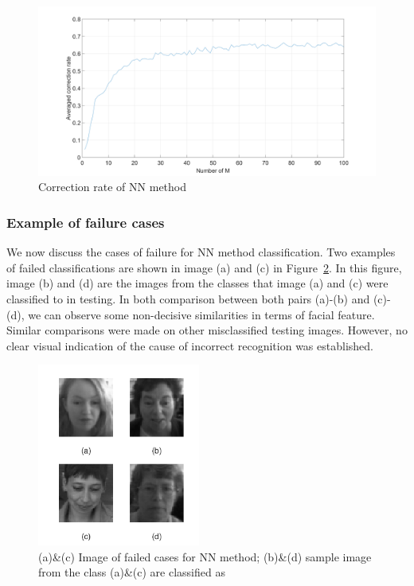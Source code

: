 \documentclass[10pt,twocolumn,letterpaper]{article}
\begin{document}
	\begin{figure}
		\begin{center}
			\includegraphics[width=1\linewidth]{correctRate_NN}
			\caption{Correction rate of NN method}
			\label{fig:q4_nn_rate}
		\end{center}
	\end{figure}
	
	
\subsubsection{Example of failure cases}
We now discuss the cases of failure for NN method classification. Two examples of failed classifications are shown in image (a) and (c) in Figure~\ref{fig:q4_nn_fail}. In this figure, image (b) and (d) are the images from the classes that image (a) and (c) were classified to in testing. In both comparison between both pairs (a)-(b) and (c)-(d), we can observe some non-decisive similarities in terms of facial feature. Similar comparisons were made on other misclassified testing images. However, no clear visual indication of the cause of incorrect recognition was established.

	\begin{figure}
		\begin{center}
			\includegraphics[width=0.9\linewidth, height = 6cm]{q4_fail_NN}
			\caption{(a)\&(c) Image of failed cases for NN method;  (b)\&(d) sample image from the class (a)\&(c) are classified as}
			\label{fig:q4_nn_fail}
		\end{center}
	\end{figure}
\end{document}
